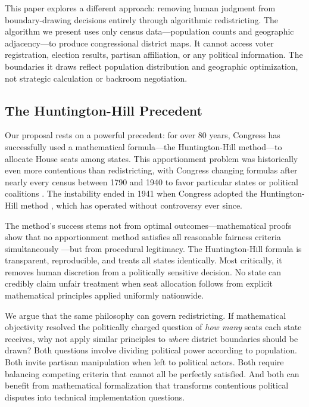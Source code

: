 This paper explores a different approach: removing human judgment from boundary-drawing decisions entirely through algorithmic redistricting. The algorithm we present uses only census data—population counts and geographic adjacency—to produce congressional district maps. It cannot access voter registration, election results, partisan affiliation, or any political information. The boundaries it draws reflect population distribution and geographic optimization, not strategic calculation or backroom negotiation.

\subsection{The Huntington-Hill Precedent}

Our proposal rests on a powerful precedent: for over 80 years, Congress has successfully used a mathematical formula—the Huntington-Hill method—to allocate House seats among states. This apportionment problem was historically even more contentious than redistricting, with Congress changing formulas after nearly every census between 1790 and 1940 to favor particular states or political coalitions \cite{balinski1982fair}. The instability ended in 1941 when Congress adopted the Huntington-Hill method \cite{huntington1928method}, which has operated without controversy ever since.

The method's success stems not from optimal outcomes—mathematical proofs show that no apportionment method satisfies all reasonable fairness criteria simultaneously \cite{balinski1982fair}—but from procedural legitimacy. The Huntington-Hill formula is transparent, reproducible, and treats all states identically. Most critically, it removes human discretion from a politically sensitive decision. No state can credibly claim unfair treatment when seat allocation follows from explicit mathematical principles applied uniformly nationwide.

We argue that the same philosophy can govern redistricting. If mathematical objectivity resolved the politically charged question of \textit{how many} seats each state receives, why not apply similar principles to \textit{where} district boundaries should be drawn? Both questions involve dividing political power according to population. Both invite partisan manipulation when left to political actors. Both require balancing competing criteria that cannot all be perfectly satisfied. And both can benefit from mathematical formalization that transforms contentious political disputes into technical implementation questions.

